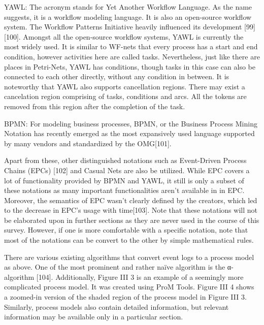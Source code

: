 YAWL: The acronym stands for Yet Another Workflow Language. As the name suggests, it is a workflow modeling language. It is also an open-source workflow system. The Workflow Patterns Initiative heavily influenced its development [99][100]. Amongst all the open-source workflow systems, YAWL is currently the most widely used. It is similar to WF-nets that every process has a start and end condition, however activities here are called tasks. Nevertheless, just like there are places in Petri-Nets, YAWL has conditions, though tasks in this case can also be connected to each other directly, without any condition in between. It is noteworthy that YAWL also supports cancellation regions. There may exist a cancelation region comprising of tasks, conditions and arcs. All the tokens are removed from this region after the completion of the task.


BPMN: For modeling business processes, BPMN, or the Business Process Mining Notation has recently emerged as the most expansively used language supported by many vendors and standardized by the OMG[101].

 
Apart from these, other distinguished notations such as Event-Driven Process Chains (EPCs) [102] and Casual Nets are also be utilized. While EPC covers a lot of functionality provided by BPMN and YAWL, it still is only a subset of these notations as many important functionalities aren’t available in in EPC. Moreover, the semantics of EPC wasn’t clearly defined by the creators, which led to the decrease in EPC’s usage with time[103]. Note that these notations will not be elaborated upon in further sections as they are never used in the course of this survey. However, if one is more comfortable with a specific notation, note that most of the notations can be convert to the other by simple mathematical rules.


There are various existing algorithms that convert event logs to a process model as above. One of the most prominent and rather naïve algorithm is the α-algorithm [104]. Additionally, Figure III 3  is an example of a seemingly more complicated process model. It was created using ProM Tools. Figure III 4 shows a zoomed-in version of the shaded region of the process model in Figure III 3. Similarly, process models also contain detailed information, but relevant information may be available only in a particular section. 
